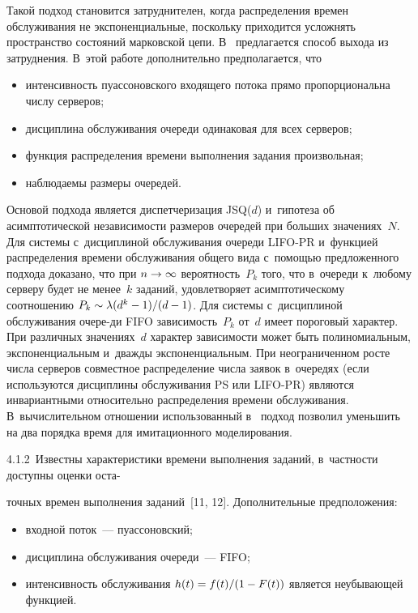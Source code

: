 \begin{multicols}{2}
    Такой подход становится затруднителен, когда распределения времен обслуживания 
не экспоненциальные, поскольку приходится усложнять пространство состояний 
марковской цепи. В~\cite{10-kon} предлагается способ выхода из затруднения. В~этой 
работе дополнительно предполагается, что
    \begin{itemize}
    \item интенсивность пуассоновского входящего потока прямо пропорциональна числу 
серверов;
    \item дисциплина обслуживания очереди одинаковая для всех серверов;
    \item функция распределения времени выполнения задания произвольная;
    \item наблюдаемы размеры очередей.
    \end{itemize}
    
    Основой подхода является диспетчеризация JSQ($d$) и~гипотеза об асимптотической 
независи\-мости размеров очередей при больших значениях~$N$. Для системы 
с~дисциплиной обслуживания очереди LIFO-PR и~функцией распределения времени 
обслуживания общего вида с~помощью предложенного подхода доказано, что при 
$n\hm\to\infty$ вероятность~$P_k$ того, что в~очереди к~любому серверу будет не 
менее~$k$ заданий, удовлетворяет асимптотическому соотношению $P_k\sim \lambda (d^k\hm-
1)/(d\hm-1)$. Для системы с~дисциплиной обслуживания очере-\linebreak ди \mbox{FIFO} зависимость~$P_k$ 
от~$d$ имеет пороговый харак\-тер. При различных значениях~$d$ характер зависимости 
может быть полиномиальным, экспоненциальным и~дважды экспоненциальным. При 
неограниченном рос\-те числа серверов совместное распределение числа заявок в~очередях 
(если используются дисциплины обслуживания PS или LIFO-PR) являются 
инвариантными относительно распределения времени обслуживания. В~вычислительном 
отношении использованный в~\cite{10-kon} подход позволил уменьшить на два порядка 
время для имитационного моделирования.
    
    \smallskip
    
    4.1.2\ Известны характеристики времени выполнения заданий, в~частности доступны 
оценки оста-\linebreak\vspace*{-12pt}

\columnbreak

\noindent
точных времен выполнения заданий~[11, 12]. Дополнительные 
предположения:
    \begin{itemize}
    \item  входной поток~--- пуассоновский;
    \item дисциплина обслуживания очереди~--- FIFO;
    \item интенсивность обслуживания $h(t)\hm= f(t)/(1\hm-F(t))$ является неубывающей 
функцией.
    \end{itemize}
    

\end{multicols}
